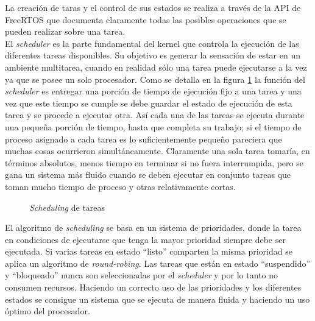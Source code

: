 \documentclass[11pt,letterpaper]{article}
\begin{document}
La creación de taras y el control de sus estados se realiza a través de la API de FreeRTOS que documenta claramente todas las posibles operaciones que se pueden realizar sobre una tarea.\\

El \textit{scheduler} es la parte fundamental del kernel que controla la ejecución de las diferentes tareas disponibles. Su objetivo es generar la sensación de estar en un ambiente multitarea, cuando en realidad sólo una tarea puede ejecutarse a la vez ya que se posee un solo procesador. Como se detalla en la figura \ref{scheduler} la función del \textit{scheduler} es entregar una porción de tiempo de ejecución fijo a una tarea y una vez que este tiempo se cumple se debe guardar el estado de ejecución de esta tarea y se procede a ejecutar otra. Así cada una de las tareas se ejecuta durante una pequeña porción de tiempo, hasta que completa su trabajo; si el tiempo de proceso asignado a cada tarea es lo suficientemente pequeño pareciera que muchas cosas ocurrieron simultáneamente. Claramente una sola tarea tomaría, en términos absolutos, menos tiempo en terminar si no fuera interrumpida, pero se gana un sistema más fluido cuando se deben ejecutar en conjunto tareas que toman mucho tiempo de proceso y otras relativamente cortas.

\begin{figure}[ht!]
\centering
{}
\caption{\textit{Scheduling} de tareas}\label{scheduler}
\end{figure}

El algoritmo de \textit{scheduling} se basa en un sistema de prioridades, donde la tarea en condiciones de ejecutarse que tenga la mayor prioridad siempre debe ser ejecutada. Si varias tareas en estado ``listo'' comparten la misma prioridad se aplica un algoritmo de \textit{round-robing}. Las tareas que están en estado ``suspendido'' y ``bloqueado'' nunca son seleccionadas por el \textit{scheduler} y por lo tanto no consumen recursos. Haciendo un correcto uso de las prioridades y los diferentes estados se consigue un sistema que se ejecuta de manera fluida y haciendo un uso óptimo del procesador.
\end{document}
